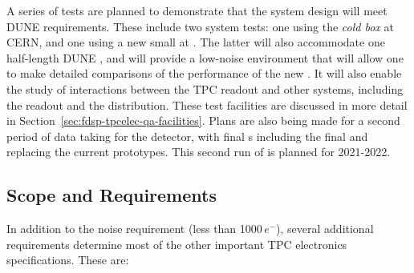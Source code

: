 A series of tests are planned to demonstrate that the  system design will meet DUNE requirements. These include two system tests: one using the  \textit{cold box} at CERN, and one using a new small \lartpc at \fnal. The latter will also accommodate one half-length DUNE , and will provide a low-noise environment that will allow one to make detailed comparisons of the performance of the new . It will also enable the study of interactions between the TPC readout and other systems, including the  readout and the  distribution. These test facilities are discussed in more detail in Section~\ref{sec:fdsp-tpcelec-qa-facilities}. Plans are also being made for a second period of data taking for the  detector, with final s including the final  and  replacing the current prototypes. This second run of  is planned for 2021-2022.


\subsection{Scope and Requirements}
\label{sec:fdsp-tpcelec-overview-scope}

In addition to the noise requirement (less than \num{1000}\,$e^{-}$), several additional requirements determine most of the other important TPC electronics specifications.  These are:

